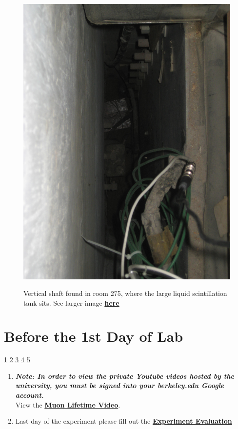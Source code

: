 \documentclass{../lab}
\begin{document}
\begin{figure}[h]
\begin{minipage}{0.33\textwidth}
    \href{http://experimentationlab.berkeley.edu/sites/default/files/images/MUO_Tank_3565.jpg}{\includegraphics[width=\linewidth,keepaspectratio]{images/MUO_Tank_3565.jpg}}
    \caption{Vertical shaft found in room 275, where the large liquid scintillation tank sits. See larger image \href{http://experimentationlab.berkeley.edu/sites/default/files/images/MUO_Tank_3565.jpg}{\textbf{here}}}
\end{minipage}
\end{figure}

\newpage

\section{Before the 1st Day of Lab}

\signatures \hyperlink{}{1} \hyperlink{}{2} \hyperlink{}{3} \hyperlink{}{4} \hyperlink{}{5} 

\begin{enumerate}
    \item \emph{\textbf{Note: In order to view the private Youtube videos hosted by the university, you must be signed into your berkeley.edu Google account.}} \\
    View the \href{http://youtu.be/uqH0qRIwBmg}{\textbf{Muon Lifetime Video}}.

    \item Last day of the experiment please fill out the \href{\ExperimentEvaluation}{\textbf{Experiment Evaluation}}

\end{enumerate}
\end{document}
